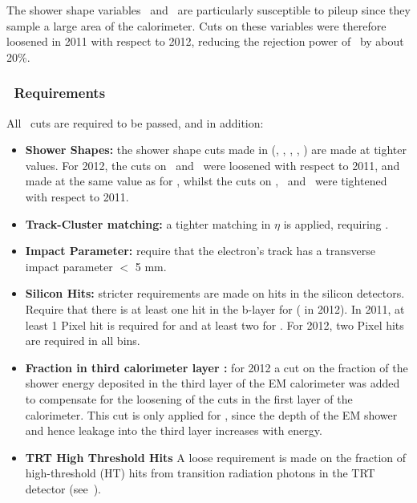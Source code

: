 The shower shape variables \Reta\ and \Rhad\ are particularly susceptible to
pileup since they sample a large area of the calorimeter. Cuts on these
variables were therefore
loosened in 2011 with respect to 2012, reducing the rejection power of \loosePP\
by about 20\%.

\subsubsection{\mediumPP\ Requirements}

All \loosePP\ cuts are required to be passed, and in addition:

\begin{itemize}
    \item {\bf Shower Shapes:} the shower shape cuts made in \loosePP
    (\Reta, \Rhad, \wetatwo, \Eratio, \wstot) are made at tighter values. For
    2012, the cuts on \Reta\ and \Rhad\ were loosened with respect to 2011, and
    made at the same value as for \loosePP, whilst the cuts on  \wetatwo, \Eratio\ and
    \wstot\ were tightened with respect to 2011.

    \item {\bf Track-Cluster matching:} a tighter matching in $\eta$ is applied,
    requiring \deltaetalt{0.005}.

    \item {\bf Impact Parameter:} require that the electron's track has a
    transverse impact parameter \dzero $<$ 5 mm.

    \item {\bf Silicon Hits:} stricter requirements are made on hits in the
    silicon detectors. Require that there is at least one hit in the b-layer for
     (\modetalt{2.37} in 2012). In 2011, at least 1
    Pixel hit is required for \modetalt{2.01} and at least two for
    \modetagt{2.01}. For 2012, two Pixel hits are required in all bins.

    \item {\bf Fraction in third calorimeter layer \fthree:} for 2012 a cut on the
    fraction of the shower energy deposited in the third layer of the EM
    calorimeter was added to compensate for the loosening of the cuts in the
    first layer of the calorimeter. This cut is only applied for \etlt{80}, since
    the depth of the EM shower and hence leakage into the third layer increases
    with energy.

    \item {\bf TRT High Threshold Hits} A loose requirement is made on the
    fraction of high-threshold (HT) hits from transition radiation photons in the
    TRT detector (see~\sec{Detector-TRT}).

\end{itemize}

